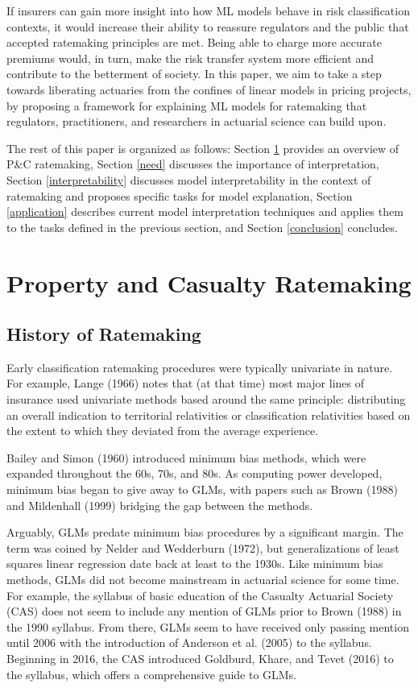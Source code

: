 \documentclass[preprint, 3p, twocolumn, letterpaper, 10pt]{elsarticle} %
\begin{document}
If insurers can gain more insight into how ML models behave in risk classification
contexts, it would increase their ability to reassure regulators and the public
that accepted ratemaking principles are met. Being able to charge more accurate
premiums would, in turn, make the risk transfer system more efficient and contribute
to the betterment of society. In this paper, we aim to take a step towards liberating
actuaries from the confines of linear models in pricing projects, by proposing a
framework for explaining ML models for ratemaking that regulators, practitioners,
and researchers in actuarial science can build upon.

The rest of this paper is organized as follows: Section \ref{ratemaking} provides
an overview of P\&C ratemaking, Section \ref{need} discusses the importance of
interpretation, Section \ref{interpretability} discusses model interpretability
in the context of ratemaking and proposes specific tasks for model explanation,
Section \ref{application} describes current model interpretation techniques and
applies them to the tasks defined in the previous section, and Section
\ref{conclusion} concludes.

\hypertarget{ratemaking}{%
\section{Property and Casualty Ratemaking}\label{ratemaking}}

\hypertarget{history-of-ratemaking}{%
\subsection{History of Ratemaking}\label{history-of-ratemaking}}

Early classification ratemaking procedures were typically univariate in nature.
For example, Lange (1966) notes that (at that time) most major lines of insurance
used univariate methods based around the same principle: distributing an overall
indication to territorial relativities or classification relativities based on
the extent to which they deviated from the average experience.

Bailey and Simon (1960) introduced minimum bias methods, which were expanded
throughout the 60s, 70s, and 80s. As computing power developed, minimum bias
began to give away to GLMs, with papers such as Brown (1988) and Mildenhall (1999)
bridging the gap between the methods.

Arguably, GLMs predate minimum bias procedures by a significant margin. The term
was coined by Nelder and Wedderburn (1972), but generalizations of least squares
linear regression date back at least to the 1930s. Like minimum bias methods,
GLMs did not become mainstream in actuarial science for some time. For example,
the syllabus of basic education of the Casualty Actuarial Society (CAS) does not
seem to include any mention of GLMs
prior to Brown (1988) in the 1990 syllabus. From there, GLMs
seem to have received only passing mention until 2006 with the introduction of
Anderson et al. (2005) to the syllabus. Beginning in 2016, the CAS introduced Goldburd, Khare, and Tevet (2016)
to the syllabus, which offers a comprehensive guide to GLMs.
\end{document}
